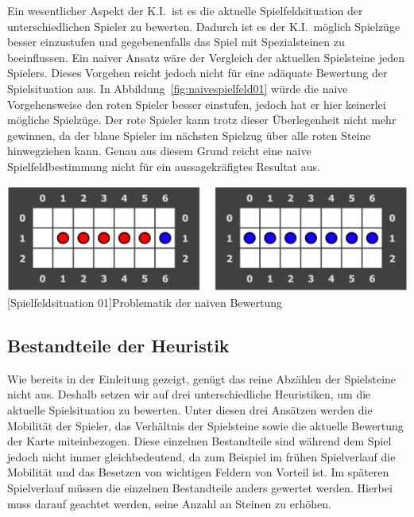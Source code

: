 Ein wesentlicher Aspekt der K.I.\ ist es die aktuelle Spielfeldsituation der unterschiedlichen Spieler zu bewerten.
Dadurch ist es der K.I.\ m\"oglich Spielz\"uge besser einzustufen und gegebenenfalls das Spiel mit Spezialsteinen zu beeinflussen.
Ein naiver Ansatz w\"are der Vergleich der aktuellen Spielsteine jeden Spielers.
Dieses Vorgehen reicht jedoch nicht f\"ur eine ad\"aquate Bewertung der Spielsituation aus.
In Abbildung~\ref{fig:naivespielfeld01} w\"urde die naive Vorgehensweise den roten Spieler besser einstufen, jedoch hat er hier keinerlei m\"ogliche Spielz\"uge.
Der rote Spieler kann trotz dieser \"Uberlegenheit nicht mehr gewinnen, da der blaue Spieler im n\"achsten Spielzug \"uber alle roten Steine hinwegziehen kann.
Genau aus diesem Grund reicht eine naive Spielfeldbestimmung nicht f\"ur ein aussagekr\"afigtes Resultat aus.

\vspace{1em}
\begin{minipage}{\linewidth}
    \centering
    \includegraphics[width=0.6\linewidth]{pics/naive-game-situation}
    [Spielfeldsituation 01]{Problematik der naiven Bewertung}
    \label{fig:naivespielfeld01}
\end{minipage}

\subsection{Bestandteile der Heuristik}\label{subsec:bestandteile-der-heuristik}
Wie bereits in der Einleitung gezeigt, gen\"ugt das reine Abz\"ahlen der Spielsteine nicht aus.
Deshalb setzen wir auf drei unterschiedliche Heuristiken, um die aktuelle Spielsituation zu bewerten.
Unter diesen drei Ans\"atzen werden die Mobilit\"at der Spieler, das Verh\"altnis der Spielsteine sowie die aktuelle Bewertung der Karte miteinbezogen.
Diese einzelnen Bestandteile sind w\"ahrend dem Spiel jedoch nicht immer gleichbedeutend, da zum Beispiel im fr\"uhen Spielverlauf die Mobilit\"at und das Besetzen von wichtigen Feldern von Vorteil ist.
Im sp\"ateren Spielverlauf m\"ussen die einzelnen Bestandteile anders gewertet werden.
Hierbei muss darauf geachtet werden, seine Anzahl an Steinen zu erh\"ohen.

